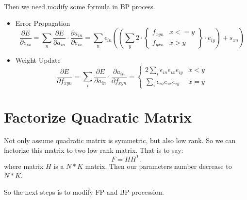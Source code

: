 \documentclass[12pt]{article}
\begin{document}
Then we need modify some formula in BP process.
\begin{itemize}
    \item Error Propagation
    \begin{equation}
    \frac{\partial E}{\partial e_{ix}} = \sum_n \frac{\partial E}{\partial a_{in}} \cdot \frac{\partial a_{in}}{\partial e_{ix}} = \sum_n  \epsilon_{in} ((\sum_y 2 \cdot
    \left \{
        \begin{array}{ll}
        f_{xyn} & x<=y \\
        f_{yxn} & x>y
        \end{array}
    \right \}
    \cdot e_{iy}) + s_{xn})
    \end{equation}

    \item Weight Update
    \begin{equation}
    \frac{\partial E}{\partial f_{xyn}} = \sum_i \frac{\partial E}{\partial a_{in}} \cdot \frac{\partial a_{in}}{\partial f_{xyn}} =
    \left \{
        \begin{array}{ll}
        2 \sum_i  \epsilon_{in} e_{ix} e_{iy} & x<y \\
        \sum_i  \epsilon_{in} e_{ix} e_{iy} & x=y
        \end{array}
    \right .
    \end{equation}

\end{itemize}

\section{Factorize Quadratic Matrix}
Not only assume quadratic matrix is symmetric, but also low rank. So we can factorize this matrix to two low rank matrix. That is to say:
\begin{equation}
    F = HH^T.
\end{equation}
where matrix $H$ is a $N*K$ matrix. Then our parameters number decrease to $N*K$.

So the next steps is to modify FP and BP procession.
\end{document}
